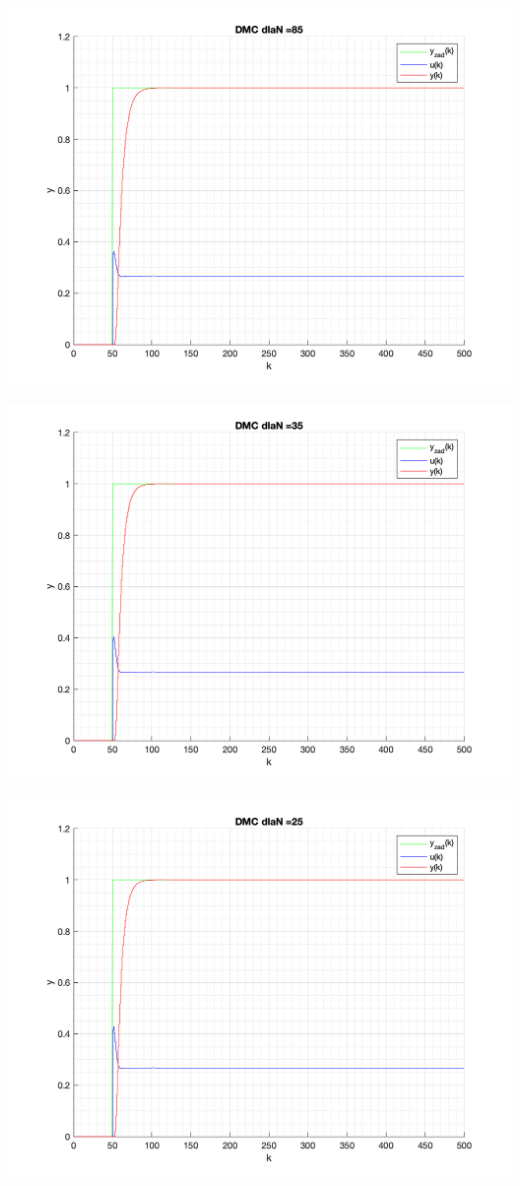 \documentclass[a4paper, 11pt]{article}
\begin{document}
\begin{enumerate}
 \includegraphics[width=\linewidth]{./ModelsP4_N/P4_DMC_N_85_png.png} 
 
 \includegraphics[width=\linewidth]{./ModelsP4_N/P4_DMC_N_35_png.png} 
 
 \includegraphics[width=\linewidth]{./ModelsP4_N/P4_DMC_N_25_png.png} 
 

\end{enumerate}
\end{document}
